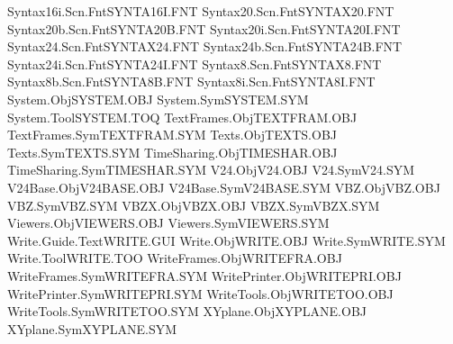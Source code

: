 Syntax16i.Scn.Fnt               SYNTA16I.FNT 
Syntax20.Scn.Fnt                SYNTAX20.FNT 
Syntax20b.Scn.Fnt               SYNTA20B.FNT 
Syntax20i.Scn.Fnt               SYNTA20I.FNT 
Syntax24.Scn.Fnt                SYNTAX24.FNT 
Syntax24b.Scn.Fnt               SYNTA24B.FNT 
Syntax24i.Scn.Fnt               SYNTA24I.FNT 
Syntax8.Scn.Fnt                 SYNTAX8.FNT  
Syntax8b.Scn.Fnt                SYNTA8B.FNT  
Syntax8i.Scn.Fnt                SYNTA8I.FNT  
System.Obj                      SYSTEM.OBJ   
System.Sym                      SYSTEM.SYM   
System.Tool                     SYSTEM.TOQ   
TextFrames.Obj                  TEXTFRAM.OBJ 
TextFrames.Sym                  TEXTFRAM.SYM 
Texts.Obj                       TEXTS.OBJ    
Texts.Sym                       TEXTS.SYM    
TimeSharing.Obj                 TIMESHAR.OBJ 
TimeSharing.Sym                 TIMESHAR.SYM 
V24.Obj                         V24.OBJ      
V24.Sym                         V24.SYM      
V24Base.Obj                     V24BASE.OBJ  
V24Base.Sym                     V24BASE.SYM  
VBZ.Obj                         VBZ.OBJ      
VBZ.Sym                         VBZ.SYM      
VBZX.Obj                        VBZX.OBJ     
VBZX.Sym                        VBZX.SYM     
Viewers.Obj                     VIEWERS.OBJ  
Viewers.Sym                     VIEWERS.SYM  
Write.Guide.Text                WRITE.GUI    
Write.Obj                       WRITE.OBJ    
Write.Sym                       WRITE.SYM    
Write.Tool                      WRITE.TOO    
WriteFrames.Obj                 WRITEFRA.OBJ 
WriteFrames.Sym                 WRITEFRA.SYM 
WritePrinter.Obj                WRITEPRI.OBJ 
WritePrinter.Sym                WRITEPRI.SYM 
WriteTools.Obj                  WRITETOO.OBJ 
WriteTools.Sym                  WRITETOO.SYM 
XYplane.Obj                     XYPLANE.OBJ  
XYplane.Sym                     XYPLANE.SYM  
